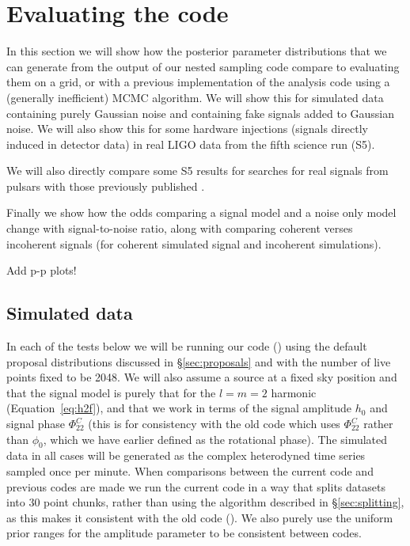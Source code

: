 \section{Evaluating the code}

In this section we will show how the posterior parameter distributions that we can generate from the output
of our nested sampling code compare to evaluating them on a grid, or with a previous implementation of the analysis code
\citep[\lppe used in e.g.][]{2014ApJ...785..119A} using a (generally inefficient) MCMC algorithm. We will show this for
simulated data containing purely Gaussian noise and containing fake signals added to Gaussian noise. We will also
show this for some hardware injections (signals directly induced in detector data) in real LIGO data from the fifth
science run (S5).

We will also directly compare some S5 results for searches for real signals from pulsars with those previously published
\citep{2010ApJ...713..671A}.

Finally we show how the odds comparing a signal model and a noise only model change with signal-to-noise ratio, along
with comparing coherent verses incoherent signals (for coherent simulated signal and incoherent simulations).

Add p-p plots!

\subsection{Simulated data}

In each of the tests below we will be running our code (\lppen) using the default proposal distributions discussed in \S\ref{sec:proposals}
and with the number of live points fixed to be 2048. We will also assume a source at a fixed sky position and that the signal model is purely
that for the $l=m=2$ harmonic (Equation~\ref{eq:h2f}), and that we work in terms of the signal amplitude $h_0$ and signal phase
$\Phi_{22}^C$ (this is for consistency with the old code which uses $\Phi_{22}^C$ rather than $\phi_0$, which we have earlier defined as the
rotational phase). The simulated data in all cases 
will be generated as the complex heterodyned
time series sampled once per minute. When comparisons between the current code and previous codes are 
made we run the current code in a way that splits datasets into 30 point chunks, rather than using the algorithm described in \S\ref{sec:splitting},
as this makes it consistent with the old code (\lppe). We also purely use the uniform prior ranges for the amplitude parameter to be
consistent between codes.


